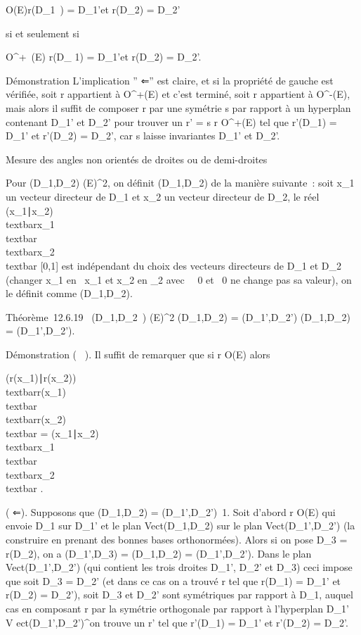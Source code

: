 \documentclass[]{article}
\begin{document}
\existsr \in O(E)\quad r(D\_1~)
= D\_1'\text et r(D\_2) =
D\_2'

si et seulement si

\existsr \in O^+~(E)\quad
r(D\_ 1) = D\_1'\text et
r(D\_2) = D\_2'.

Démonstration L'implication '' ⇐'' est claire, et si la propriété de
gauche est vérifiée, soit r appartient à O^+(E) et c'est
terminé, soit r appartient à O^-(E), mais alors il suffit de
composer r par une symétrie s par rapport à un hyperplan contenant
D\_1' et D\_2' pour trouver un r' = s \cdot r \in
O^+(E) tel que r'(D\_1) = D\_1' et
r'(D\_2) = D\_2', car s laisse invariantes D\_1'
et D\_2'.

Mesure des angles non orientés de droites ou de demi-droites

Pour (D\_1,D\_2) \inD(E)^2, on définit
\phi(D\_1,D\_2) de la manière suivante~: soit x\_1
un vecteur directeur de D\_1 et x\_2 un vecteur
directeur de D\_2, le réel 
\textbar{}(x\_1∣x\_2)\textbar{}
\over
\\textbar{}x\_1\\textbar{}
\\textbar{}x\_2\\textbar{} \in
{[}0,1{]} est indépendant du choix des vecteurs directeurs de
D\_1 et D\_2 (changer x\_1 en \lambda~x\_1 et
x\_2 en \mux\_2 avec \lambda~\neq~0 et
\mu\neq~0 ne change pas sa valeur), on le définit
comme \phi(D\_1,D\_2).

Théorème~12.6.19 \forall~(D\_1,D\_2~)
\inD(E)^2\quad
\overline(D\_1,D\_2) =
\overline(D\_1',D\_2')\quad
\Leftrightarrow \quad
\phi(D\_1,D\_2) = \phi(D\_1',D\_2').

Démonstration ( \rigtharrow~). Il suffit de remarquer que si r \in O(E) alors


\textbar{}(r(x\_1)∣r(x\_2))\textbar{}
\over
\\textbar{}r(x\_1)\\textbar{}
\\textbar{}r(x\_2)\\textbar{}
=
\textbar{}(x\_1∣x\_2)\textbar{}
\over
\\textbar{}x\_1\\textbar{}
\\textbar{}x\_2\\textbar{} .

( ⇐). Supposons que \phi(D\_1,D\_2) =
\phi(D\_1',D\_2')\neq~1. Soit
d'abord r \in O(E) qui envoie D\_1 sur D\_1' et le plan
Vect(D\_1,D\_2) sur le plan
Vect(D\_1',D\_2') (la construire en prenant des bonnes
bases orthonormées). Alors si on pose D\_3 = r(D\_2), on
a \phi(D\_1',D\_3) = \phi(D\_1,D\_2) =
\phi(D\_1',D\_2'). Dans le plan
Vect(D\_1',D\_2') (qui contient les trois droites
D\_1', D\_2' et D\_3) ceci impose que soit
D\_3 = D\_2' (et dans ce cas on a trouvé r tel que
r(D\_1) = D\_1' et r(D\_2) = D\_2'),
soit D\_3 et D\_2' sont symétriques par rapport à
D\_1, auquel cas en composant r par la symétrie orthogonale par
rapport à l'hyperplan D\_1' \oplus~ V
ect(D\_1',D\_2')^\bot on trouve un r' tel que
r'(D\_1) = D\_1' et r'(D\_2) = D\_2'.
\end{document}
